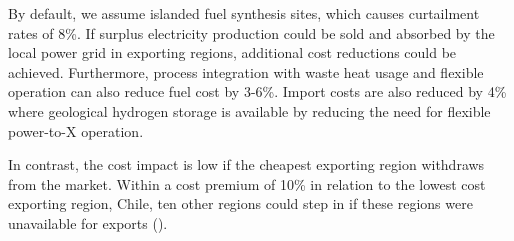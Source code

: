 By default, we assume islanded fuel synthesis sites, which causes curtailment
rates of 8\%. If surplus electricity production could be sold and absorbed by
the local power grid in exporting regions, additional cost reductions could be
achieved. Furthermore, process integration with waste heat usage and flexible
operation can also reduce fuel cost by 3-6\%. Import costs are also reduced by
4\% where geological hydrogen storage is available by reducing the need for
flexible \mbox{power-to-X} operation.

In contrast, the cost impact is low if the cheapest exporting region withdraws
from the market. Within a cost premium of 10\% in relation to the lowest cost
exporting region, Chile, ten other regions could step in if these regions were
unavailable for exports ().
